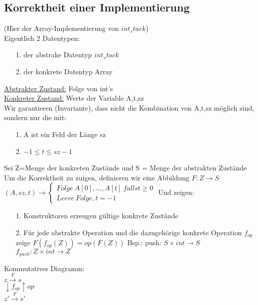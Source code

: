 \documentclass[a4paper]{article}
\begin{document}
\subsection*{Korrektheit einer Implementierung}
(Hier der Array-Implementierung von $int_stack$)\\
Eigentlich 2 Datentypen:
\begin{itemize}
\item[1.] der abstrake Datentyp $int_stack$
\item[2.] der konkrete Datentyp Array
\end{itemize}
\underline{Abstrakter Zustand:} Folge von int's\\
\underline{Konkreter Zustand:} Werte der Variable A,t,sz\\
Wir garantieren (Invariante), dass nicht die Kombination von A,t,sz möglich sind, sondern nur die mit:
\begin{itemize}
\item[1.]A ist ein Feld der Länge sz
\item[2.] $-1 \leq t\leq sz-1$
\end{itemize}
Sei Z=Menge der konkreten Zustände und S = Menge der abstrakten Zustände\\
Um die Korrektheit zu zuigen, definieren wir eine Abbildung $F: Z \rightarrow S$\\
$(A,sz,t) \rightarrow \left\lbrace \begin{array}{l}
	Folge\ A[0],...,A[t]\ falls t\geq 0\\
	Leere\ Folge, t=-1
\end{array}\right.$
Und zeigen:
\begin{itemize}
\item[1.] Konstruktoren erzeugen gültige konkrete Zustände
\item[2.] Für jede abstrakte Operation und die dazugehörige konkrete Operation $f_{op}$ zeige $F(f_{op}(Z)) = op(F(Z))$
	Bsp.: push: $S\times int \rightarrow S $\\
	$f_{push}: Z \times int \rightarrow Z$
\end{itemize}
Kommutatives Diagramm:\\
$z \xrightarrow{F} s$\\
$\downarrow f_{op} \uparrow op$\\
$z' \xrightarrow{F} s'$
\end{document}
